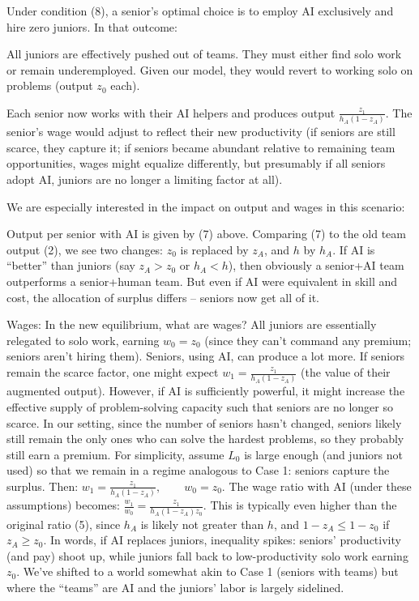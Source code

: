 \documentclass[12pt]{article}
\begin{document}
Under condition (8), a {senior's optimal choice} is to employ AI
exclusively and {hire zero juniors}. In that outcome:

All juniors are effectively {pushed out} of teams. They must
either find solo work or remain underemployed. Given our model, they
would revert to working solo on problems (output \(z_0\) each).

Each senior now works with their AI helpers and produces output
\(\frac{z_1}{h_A(1-z_A)}\). The {senior's wage} would adjust to
reflect their new productivity (if seniors are still scarce, they
capture it; if seniors became abundant relative to remaining team
opportunities, wages might equalize differently, but presumably if all
seniors adopt AI, juniors are no longer a limiting factor at all).

We are especially interested in the {impact on output and wages}
in this scenario:

{Output per senior with AI} is given by (7) above. Comparing
(7) to the old team output (2), we see two changes: \(z_0\) is
replaced by \(z_A\), and \(h\) by \(h_A\). If AI is ``better'' than
juniors (say \(z_A > z_0\) or \(h_A < h\)), then obviously a senior+AI
team outperforms a senior+human team. But even if AI were equivalent
in skill and cost, the {allocation of surplus} differs -- seniors
now get {all} of it.

{Wages:} In the new equilibrium, what are wages? All juniors
are essentially relegated to solo work, earning \(w_0 = z_0\) (since
they can't command any premium; seniors aren't hiring them). Seniors,
using AI, can produce a lot more. If seniors remain the scarce factor,
one might expect \(w_1 = \frac{z_1}{h_A(1-z_A)}\) (the value of their
augmented output). However, if AI is sufficiently powerful, it might
increase the {effective supply of problem-solving capacity} such
that seniors are no longer so scarce. In our setting, since the number
of seniors hasn't changed, seniors likely still remain the only ones
who can solve the hardest problems, so they probably still earn a
premium. For simplicity, assume \(L_0\) is large enough (and juniors
not used) so that we remain in a regime analogous to Case 1: seniors
capture the surplus. Then: $ w_1 = \frac{z_1}{h_A(1-z_A)},
\qquad w_0 = z_0.$ The {wage ratio with AI} (under these
assumptions) becomes:
\(\frac{w_1}{w_0} = \frac{z_1}{h_A (1-z_A)  z_0}.\) This is
typically {even higher} than the original ratio (5), since
\(h_A\) is likely not greater than \(h\), and \(1-z_A \le 1-z_0\) if
\(z_A \ge z_0\). In words, if AI replaces juniors, {inequality
spikes}: seniors' productivity (and pay) shoot up, while juniors fall
back to low-productivity solo work earning \(z_0\). We've shifted to a
world somewhat akin to Case 1 (seniors with teams) but where the
``teams'' are AI and the juniors' labor is largely sidelined.
\end{document}
